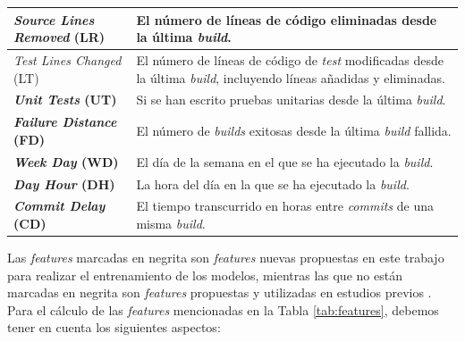 \begin{table}[h]
\begin{tabular}{|>{\raggedright\arraybackslash}m{4cm}|>{\raggedright\arraybackslash}m{8cm}|}
        \hline
        \textbf{\textit{Source Lines Removed} (LR)} & El número de líneas de código eliminadas desde la última \textit{build}.\\
        \hline
        \textit{Test Lines Changed} (LT) & El número de líneas de código de \textit{test} modificadas desde la última \textit{build}, incluyendo líneas añadidas y eliminadas.\\
        \hline
        \textbf{\textit{Unit Tests} (UT)} & Si se han escrito pruebas unitarias desde la última \textit{build}.\\
        \hline
        \textbf{\textit{Failure Distance} (FD)\footnotemark[1]} & El número de \textit{builds} exitosas desde la última \textit{build} fallida.\\
        \hline
        \textbf{\textit{Week Day} (WD)\footnotemark[1]} & El día de la semana en el que se ha ejecutado la \textit{build}.\\
        \hline
        \textbf{\textit{Day Hour} (DH)\footnotemark[1]} & La hora del día en la que se ha ejecutado la \textit{build}.\\
        \hline
        \textbf{\textit{Commit Delay} (CD)} & El tiempo transcurrido en horas entre \textit{commits} de una misma \textit{build}.\\
        \hline
    \end{tabular}
\end{table}

Las \textit{features} marcadas en negrita son \textit{features} nuevas propuestas en este trabajo
para realizar el entrenamiento de los modelos, mientras las que no están marcadas en negrita son
\textit{features} propuestas y utilizadas en estudios previos \cite{2}.\\

\noindent Para el cálculo de las \textit{features} mencionadas en la Tabla \ref{tab:features},
debemos tener en cuenta los siguientes aspectos:

